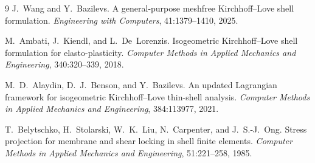 \documentclass[11pt,a4paper]{article}
\begin{document}
\begin{thebibliography}{9}
J.~Wang and Y.~Bazilevs.
\newblock A general-purpose meshfree Kirchhoff--Love shell formulation.
\newblock \emph{Engineering with Computers}, 41:1379--1410, 2025.

M.~Ambati, J.~Kiendl, and L.~De~Lorenzis.
\newblock Isogeometric Kirchhoff--Love shell formulation for elasto-plasticity.
\newblock \emph{Computer Methods in Applied Mechanics and Engineering}, 340:320--339, 2018.

M.~D.~Alaydin, D.~J.~Benson, and Y.~Bazilevs.
\newblock An updated Lagrangian framework for isogeometric Kirchhoff--Love thin-shell analysis.
\newblock \emph{Computer Methods in Applied Mechanics and Engineering}, 384:113977, 2021.

T.~Belytschko, H.~Stolarski, W.~K.~Liu, N.~Carpenter, and J.~S.-J.~Ong.
\newblock Stress projection for membrane and shear locking in shell finite elements.
\newblock \emph{Computer Methods in Applied Mechanics and Engineering}, 51:221--258, 1985.
\end{thebibliography}
\end{document}
